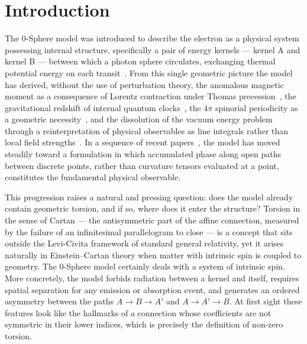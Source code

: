 \documentclass[%
 reprint,
 amsmath,amssymb,
 aps,
 prb,
]{revtex4-2}
\numberwithin{equation}{section}
\begin{document}
\section{Introduction}
\label{sec:intro}

The 0-Sphere model was introduced to describe the electron as a physical system possessing internal structure, specifically a pair of energy kernels --- kernel A and kernel B --- between which a photon sphere circulates, exchanging thermal potential energy on each transit~\cite{paper33,paper35}. From this single geometric picture the model has derived, without the use of perturbation theory, the anomalous magnetic moment as a consequence of Lorentz contraction under Thomas precession~\cite{paper10,paper38}, the gravitational redshift of internal quantum clocks~\cite{paper22}, the $4\pi$ spinorial periodicity as a geometric necessity~\cite{paper38}, and the dissolution of the vacuum energy problem through a reinterpretation of physical observables as line integrals rather than local field strengths~\cite{paper32}. In a sequence of recent papers~\cite{paper29,paper30,paper31,paper40}, the model has moved steadily toward a formulation in which accumulated phase along open paths between discrete points, rather than curvature tensors evaluated at a point, constitutes the fundamental physical observable.

This progression raises a natural and pressing question: does the model already contain geometric torsion, and if so, where does it enter the structure? Torsion in the sense of Cartan --- the antisymmetric part of the affine connection, measured by the failure of an infinitesimal parallelogram to close --- is a concept that sits outside the Levi-Civita framework of standard general relativity, yet it arises naturally in Einstein--Cartan theory when matter with intrinsic spin is coupled to geometry. The 0-Sphere model certainly deals with a system of intrinsic spin. More concretely, the model forbids radiation between a kernel and itself, requires spatial separation for any emission or absorption event, and generates an ordered asymmetry between the paths $A\to B\to A'$ and $A\to A'\to B$. At first sight these features look like the hallmarks of a connection whose coefficients are not symmetric in their lower indices, which is precisely the definition of non-zero torsion.
\end{document}
